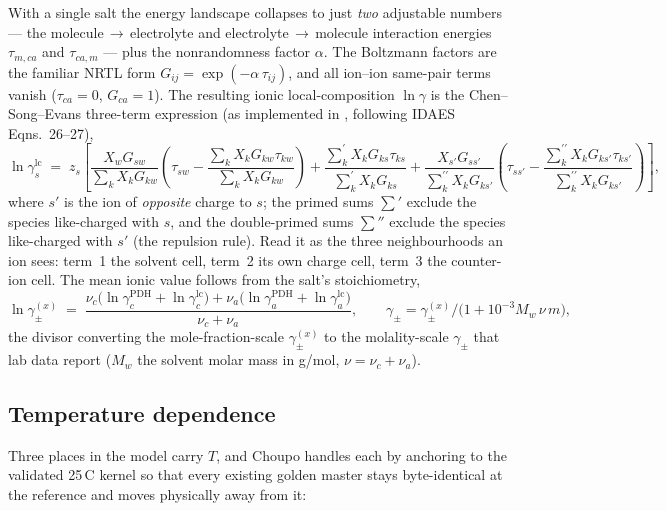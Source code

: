 \documentclass[11pt,a4paper]{article}
\begin{document}
With a single salt the energy landscape collapses to just \emph{two}
adjustable numbers --- the molecule\,$\to$\,electrolyte and
electrolyte\,$\to$\,molecule interaction energies $\tau_{m,ca}$ and
$\tau_{ca,m}$ --- plus the nonrandomness factor $\alpha$.  The Boltzmann
factors are the familiar NRTL form $G_{ij} = \exp(-\alpha\,\tau_{ij})$,
and all ion--ion same-pair terms vanish ($\tau_{ca}=0$, $G_{ca}=1$).
The resulting ionic local-composition $\ln\gamma$ is the
Chen--Song--Evans three-term expression (as implemented in
, following IDAES Eqns.~26--27),
\begin{equation}
   \ln\gamma_s^{\mathrm{lc}}
   \;=\;
   z_s\!\left[
      \frac{X_w G_{sw}}{\sum_k X_k G_{kw}}
      \!\left(\tau_{sw} - \frac{\sum_k X_k G_{kw}\tau_{kw}}{\sum_k X_k G_{kw}}\right)
      +\frac{\sum_{k}^{\prime} X_k G_{ks}\tau_{ks}}{\sum_{k}^{\prime} X_k G_{ks}}
      +\frac{X_{s'} G_{s s'}}{\sum_k^{\prime\prime} X_k G_{k s'}}
       \!\left(\tau_{s s'} - \frac{\sum_k^{\prime\prime} X_k G_{k s'}\tau_{k s'}}{\sum_k^{\prime\prime} X_k G_{k s'}}\right)
   \right],
   \label{eq:enrtl-lc}
\end{equation}
where $s'$ is the ion of \emph{opposite} charge to $s$; the primed sums
$\sum'$ exclude the species like-charged with $s$, and the
double-primed sums $\sum''$ exclude the species like-charged with $s'$
(the repulsion rule).  Read it as the three neighbourhoods an ion sees:
term~1 the solvent cell, term~2 its own charge cell, term~3 the
counter-ion cell.  The mean ionic value follows from the salt's
stoichiometry,
\begin{equation}
   \ln\gamma_\pm^{(x)}
   \;=\;
   \frac{\nu_c\bigl(\ln\gamma_c^{\mathrm{PDH}}+\ln\gamma_c^{\mathrm{lc}}\bigr)
        +\nu_a\bigl(\ln\gamma_a^{\mathrm{PDH}}+\ln\gamma_a^{\mathrm{lc}}\bigr)}
        {\nu_c+\nu_a},
   \qquad
   \gamma_\pm = \gamma_\pm^{(x)}\Big/\!\bigl(1 + 10^{-3}M_w\,\nu\,m\bigr),
   \label{eq:enrtl-mean}
\end{equation}
the divisor converting the mole-fraction-scale $\gamma_\pm^{(x)}$ to the
molality-scale $\gamma_\pm$ that lab data report ($M_w$ the solvent
molar mass in g/mol, $\nu = \nu_c+\nu_a$).

\subsection{Temperature dependence}

Three places in the model carry $T$, and Choupo handles each by anchoring
to the validated 25\,\textdegree C kernel so that every existing golden
master stays byte-identical at the reference and moves physically away
from it:
\end{document}
